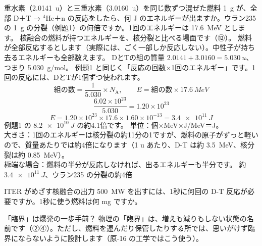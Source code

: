 \label{ph:原-15:ex13}
\begin{phreidai}[D-T 核融合の燃料 1 g]
重水素（\qty{2.0141}{u}）と三重水素（\qty{3.0160}{u}）を同じ数ずつ混ぜた燃料 \qty{1}{g} が、全部 D＋T → $^4$He＋n の反応をしたら、何 J のエネルギーが出ますか。ウラン235 の \qty{1}{g} の分裂（例題1）の何倍ですか。1回のエネルギーは \qty{17.6}{MeV} とします。
\phbamen
核融合の燃料が持つエネルギーを、核分裂と比べる場面です（⑫）。
\phmushi
燃料が全部反応するとします（実際には、ごく一部しか反応しない）。中性子が持ち去るエネルギーも全部数えます。
\phzu
DとTの組の質量 $2.0141+3.0160=\qty{5.030}{u}$、つまり \qty{5.030}{g/mol}。
\phriyu
例題1 と同じく「反応の回数×1回のエネルギー」です。1回の反応には、DとTが1個ずつ使われます。
\phtateru
\[ \text{組の数}=\frac{1}{5.030}\times N_{\mathrm A},\qquad E=\text{組の数}\times\qty{17.6}{MeV} \]
\phtoku
\[ \frac{6.02\times10^{23}}{5.030}=1.20\times10^{23} \]
\[ E=1.20\times10^{23}\times17.6\times1.60\times10^{-13}=\qty{3.4e11}{J} \]
例題1 の $\qty{8.2e10}{J}$ の約4.1倍です。
\phtashikame
単位：個×MeV×J/MeV＝J。\\
大きさ：1回のエネルギーは核分裂の約11分の1ですが、燃料の原子がずっと軽いので、質量あたりでは約4倍になります（1 u あたり、D-T は約 \qty{3.5}{MeV}、核分裂は約 \qty{0.85}{MeV}）。\\
極端な場合：燃料の半分が反応しなければ、出るエネルギーも半分です。
\kotae 約 $\qty{3.4e11}{J}$、ウラン235 の分裂の約4倍
\end{phreidai}
\begin{jibun}
ITER がめざす核融合の出力 \qty{500}{MW} を出すには、1秒に何回の D-T 反応が必要ですか。1秒に使う燃料は何 mg ですか。
\end{jibun}

\begin{tsumazuki}{「臨界」は爆発の一歩手前？}
物理の「臨界」は、増えも減りもしない状態の名前です（②④）。ただし、燃料を運んだり保管したりする所では、思いがけず臨界にならないように設計します（原-16 の工学ではこう使う）。
\end{tsumazuki}

